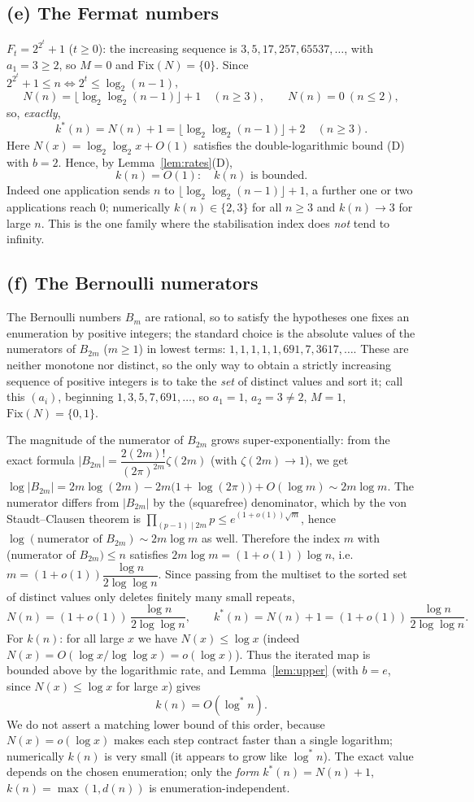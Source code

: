 \documentclass[12pt]{article}
\theoremstyle{definition}
\begin{document}
\subsection{(e) The Fermat numbers}
$F_t=2^{2^t}+1$ ($t\ge0$): the increasing sequence is $3,5,17,257,65537,\dots$, with
$a_1=3\ge2$, so $M=0$ and $\mathrm{Fix}(N)=\{0\}$. Since $2^{2^t}+1\le n\iff
2^t\le\log_2(n-1)$,
\[
  N(n)=\bigl\lfloor\log_2\log_2(n-1)\bigr\rfloor+1\quad(n\ge3),\qquad N(n)=0\ (n\le2),
\]
so, \emph{exactly},
\[
  k^*(n)=N(n)+1=\bigl\lfloor\log_2\log_2(n-1)\bigr\rfloor+2\quad(n\ge3).
\]
Here $N(x)=\log_2\log_2 x+O(1)$ satisfies the double-logarithmic bound (D) with
$b=2$. Hence, by Lemma~\ref{lem:rates}(D),
\[
  k(n)=O(1):\quad\text{$k(n)$ is bounded.}
\]
Indeed one application sends $n$ to $\lfloor\log_2\log_2(n-1)\rfloor+1$, a further one
or two applications reach $0$; numerically $k(n)\in\{2,3\}$ for all $n\ge3$ and
$k(n)\to 3$ for large $n$. This is the one family where the stabilisation index does
\emph{not} tend to infinity.

\subsection{(f) The Bernoulli numerators}
The Bernoulli numbers $B_m$ are rational, so to satisfy the hypotheses one fixes an
enumeration by positive integers; the standard choice is the absolute values of the
numerators of $B_{2m}$ ($m\ge1$) in lowest terms:
$1,1,1,1,1,691,7,3617,\dots$. These are neither monotone nor distinct, so the only
way to obtain a strictly increasing sequence of positive integers is to take the
\emph{set} of distinct values and sort it; call this $(a_i)$, beginning
$1,3,5,7,691,\dots$, so $a_1=1$, $a_2=3\ne2$, $M=1$, $\mathrm{Fix}(N)=\{0,1\}$.

The magnitude of the numerator of $B_{2m}$ grows super-exponentially: from the exact
formula $|B_{2m}|=\dfrac{2(2m)!}{(2\pi)^{2m}}\zeta(2m)$ (with $\zeta(2m)\to1$), we get
$\log|B_{2m}|=2m\log(2m)-2m\bigl(1+\log(2\pi)\bigr)+O(\log m)\sim 2m\log m$. The
numerator differs from $|B_{2m}|$ by the (squarefree) denominator, which by the von
Staudt--Clausen theorem is $\prod_{(p-1)\mid 2m}p\le e^{(1+o(1))\sqrt{m}}$, hence
$\log(\text{numerator of }B_{2m})\sim 2m\log m$ as well. Therefore the index $m$ with
(numerator of $B_{2m})\le n$ satisfies $2m\log m=(1+o(1))\log n$, i.e.
$m=(1+o(1))\dfrac{\log n}{2\log\log n}$. Since passing from the multiset to the sorted
set of distinct values only deletes finitely many small repeats,
\[
  N(n)=(1+o(1))\,\frac{\log n}{2\log\log n},\qquad
  k^*(n)=N(n)+1=(1+o(1))\,\frac{\log n}{2\log\log n}.
\]
For $k(n)$: for all large $x$ we have $N(x)\le\log x$ (indeed
$N(x)=O(\log x/\log\log x)=o(\log x)$). Thus the iterated map is bounded above by the
logarithmic rate, and Lemma~\ref{lem:upper} (with $b=e$, since $N(x)\le\log x$ for large $x$) gives
\[
  k(n)=O(\log^* n).
\]
We do not assert a matching lower bound of this order, because $N(x)=o(\log x)$ makes
each step contract faster than a single logarithm; numerically $k(n)$ is very small
(it appears to grow like $\log^* n$). The exact value depends on the chosen
enumeration; only the \emph{form} $k^*(n)=N(n)+1$, $k(n)=\max(1,d(n))$ is
enumeration-independent.
\end{document}
